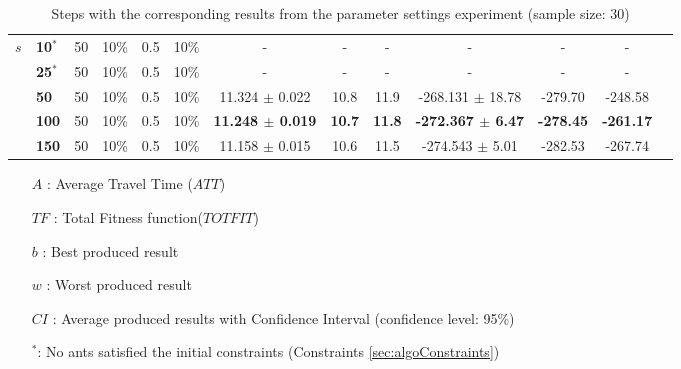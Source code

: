 \begin{sidewaystable}
\begin{tabular}{|l|l|l|l|l|l||c|c|c|c|c|c|c|}
    \hline
    $s$ & \textbf{10$^*$} & 50 & 10\% & 0.5 & 10\% & - & - & - & - & -& - \\
    ~ & \textbf{25$^*$} & 50 & 10\% & 0.5 & 10\% & - & - & - & - & - & -  \\
    ~ & \textbf{50} & 50 & 10\% & 0.5 & 10\% & 11.324 $\pm$ 0.022 & 10.8 & 11.9 & -268.131 $\pm$ 18.78 & -279.70 & -248.58\\
    ~ & \textbf{100} & 50 & 10\% & 0.5 & 10\% & \textbf{11.248 $\pm$ 0.019} & \textbf{10.7} & \textbf{11.8} & \textbf{-272.367 $\pm$ 6.47} & \textbf{-278.45} & \textbf{-261.17}\\
    ~ & \textbf{150} & 50 & 10\% & 0.5 & 10\% & 11.158 $\pm$ 0.015 & 10.6 & 11.5 & -274.543 $\pm$ 5.01 & -282.53 & -267.74\\
    \hline
    \end{tabular}
    \caption {Steps with the corresponding results from the parameter settings experiment (sample size: 30)}
    \tiny
    \begin{itemize}[noitemsep]
    \item[$A$ :] Average Travel Time ($ATT$)
    \item[$TF$ :] Total Fitness function($TOTFIT$)
    \item[$b$ :] Best produced result
    \item[$w$ :] Worst produced result
    \item[$CI$ :] Average produced results with Confidence Interval (confidence level: 95\%)
    \item[$^*$:] No ants satisfied the initial constraints (Constraints \vref{sec:algoConstraints})
    \end{itemize}
    \label{table:pm1}
\end{sidewaystable}


